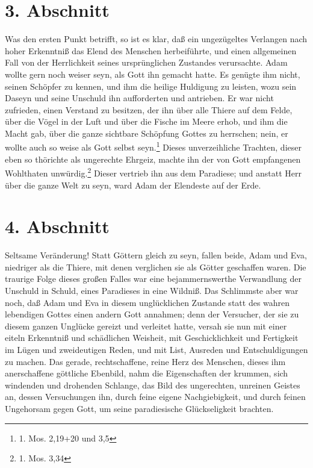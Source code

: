 \section{3. Abschnitt} \label{kap7_ab3}

Was den ersten Punkt betrifft, so ist es klar, daß ein ungezügeltes Verlangen
nach hoher Erkenntniß das Elend des Menschen herbeiführte, und einen allgemeinen
Fall von der Herrlichkeit seines ursprünglichen Zustandes verursachte. Adam
wollte gern noch weiser seyn, als Gott ihn gemacht hatte. Es genügte ihm nicht,
seinen Schöpfer zu kennen, und ihm die heilige Huldigung zu leisten, wozu sein
Daseyn und seine Unschuld ihn aufforderten und antrieben. Er war nicht
zufrieden, einen Verstand zu besitzen, der ihn über alle Thiere auf dem Felde,
über die Vögel in der Luft und über die Fische im Meere erhob, und ihm die Macht
gab, über die ganze sichtbare Schöpfung Gottes zu herrschen; nein, er wollte
auch so weise als Gott selbst seyn.\footnote{1. Mos. 2,19+20 und 3,5} Dieses
unverzeihliche Trachten, dieser eben so thörichte als ungerechte Ehrgeiz, machte
ihn der von Gott empfangenen Wohlthaten unwürdig.\footnote{1. Mos. 3,34} Dieser
vertrieb ihn aus dem Paradiese; und anstatt Herr über die ganze Welt zu seyn,
ward Adam der Elendeste auf der Erde.

\section{4. Abschnitt} \label{kap7_ab4}

Seltsame Veränderung! Statt Göttern gleich zu seyn, fallen beide, Adam und Eva,
niedriger als die Thiere, mit denen verglichen sie als Götter geschaffen waren.
Die traurige Folge dieses großen Falles war eine bejammernswerthe Verwandlung
der Unschuld in Schuld, eines Paradieses in eine Wildniß. Das Schlimmste aber
war noch, daß Adam und Eva in diesem unglücklichen Zustande statt des wahren
lebendigen Gottes einen andern Gott annahmen; denn der Versucher, der sie zu
diesem ganzen Unglücke gereizt und verleitet hatte, versah sie nun mit einer
eiteln Erkenntniß und schädlichen Weisheit, mit Geschicklichkeit und Fertigkeit
im Lügen und zweideutigen Reden, und mit List, Ausreden und Entschuldigungen zu
machen. Das gerade, rechtschaffene, reine Herz des Menschen, dieses ihm
anerschaffene göttliche Ebenbild, nahm die Eigenschaften der krummen, sich
windenden und drohenden Schlange, das Bild des ungerechten, unreinen Geistes an,
dessen Versuchungen ihn, durch feine eigene Nachgiebigkeit, und durch feinen
Ungehorsam gegen Gott, um seine paradiesische Glückseligkeit brachten.

